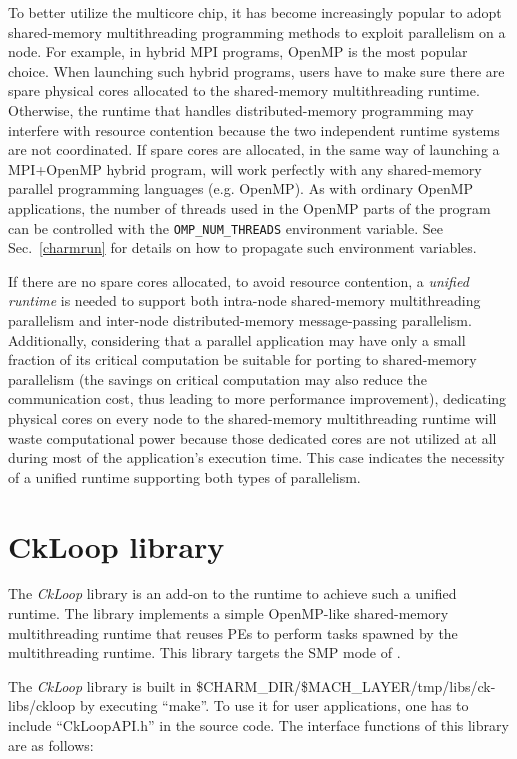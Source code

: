 To better utilize the multicore chip, it has become increasingly popular to
adopt shared-memory multithreading programming methods to exploit parallelism
on a node. For example, in hybrid MPI programs, OpenMP is the most popular
choice.  When launching such hybrid programs, users have to make sure there are
spare physical cores allocated to the shared-memory multithreading runtime.
Otherwise, the runtime that handles distributed-memory programming may
interfere with resource contention because the two independent runtime systems
are not coordinated.  If spare cores are allocated, in the same way of
launching a MPI+OpenMP hybrid program, \charmpp{} will work perfectly with any
shared-memory parallel programming languages (e.g. OpenMP). As with ordinary
OpenMP applications, the number of threads used in the OpenMP parts of the
program can be controlled with the {\tt OMP\_NUM\_THREADS} environment
variable.  See Sec.~\ref{charmrun} for details on how to propagate such
environment variables.

If there are no spare cores allocated, to avoid resource contention, a
\emph{unified runtime} is needed to support both intra-node shared-memory
multithreading parallelism and inter-node distributed-memory
message-passing parallelism. Additionally, considering that a parallel
application may have only a small fraction of its critical computation be
suitable for porting to shared-memory parallelism (the savings on critical
computation may also reduce the communication cost, thus leading to more
performance improvement), dedicating physical cores on every node to the
shared-memory multithreading runtime will waste computational power because
those dedicated cores are not utilized at all during most of the application's
execution time. This case indicates the necessity of a unified
runtime supporting both types of parallelism.


\section{CkLoop library}
The \emph{CkLoop} library is an add-on to the \charmpp{} runtime to achieve such
a unified runtime.  The library implements a simple OpenMP-like shared-memory
multithreading runtime that reuses \charmpp{} PEs to perform tasks spawned by
the multithreading runtime. This library targets the SMP mode of \charmpp{}.

The \emph{CkLoop} library is built in
\$CHARM\_DIR/\$MACH\_LAYER/tmp/libs/ck-libs/ckloop by executing ``make''.
To use it for user applications, one has to include ``CkLoopAPI.h'' in
the source code. The interface functions of this library are as
follows:

